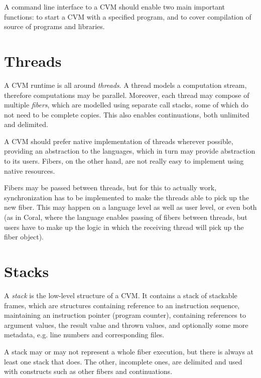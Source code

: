 A command line interface to a CVM should enable two main important functions: to start a CVM with a specified program, and to cover compilation of source of programs and libraries. 






\section{Threads}

A CVM runtime is all around {\em threads}. A thread models a computation stream, therefore computations may be parallel. Moreover, each thread may compose of multiple {\em fibers}, which are modelled using separate call stacks, some of which do not need to be complete copies. This also enables continuations, both unlimited and delimited. 

A CVM should prefer native implementation of threads wherever possible, providing an abstraction to the languages, which in turn may provide abstraction to its users. Fibers, on the other hand, are not really easy to implement using native resources. 

Fibers may be passed between threads, but for this to actually work, synchronization has to be implemented to make the threads able to pick up the new fiber. This may happen on a language level as well as user level, or even both (as in Coral, where the language enables passing of fibers between threads, but users have to make up the logic in which the receiving thread will pick up the fiber object). 





\section{Stacks}

A {\em stack} is the low-level structure of a CVM. It contains a stack of stackable frames, which are structures containing reference to an instruction sequence, maintaining an instruction pointer (program counter), containing references to argument values, the result value and thrown values, and optionally some more metadata, e.g. line numbers and corresponding files. 

A stack may or may not represent a whole fiber execution, but there is always at least one stack that does. The other, incomplete ones, are delimited and used with constructs such as other fibers and continuations. 

